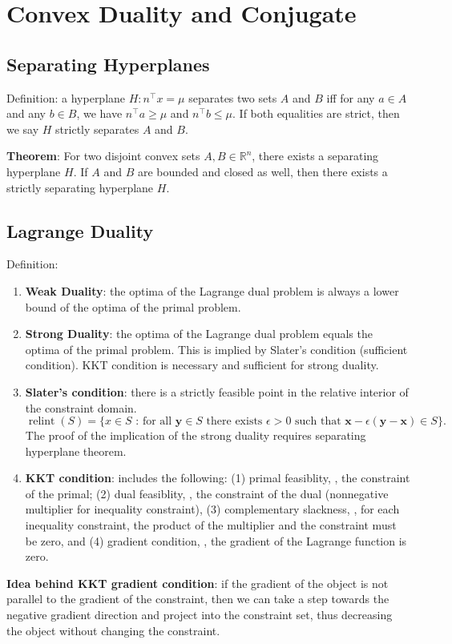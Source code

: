 \section{Convex Duality and Conjugate}

\subsection{Separating Hyperplanes}

Definition: a hyperplane $H: n^\top x = \mu$ separates two sets $A$ and $B$ iff for any $a \in A$ and any $b \in B$, we have $n^\top a \ge \mu$ and $n^\top b \le \mu$. If both equalities are strict, then we say $H$ strictly separates $A$ and $B$.

\textbf{Theorem}: For two disjoint convex sets $A, B \in \mathbb{R}^{n}$, there exists a separating hyperplane $H$. If $A$ and $B$ are bounded and closed as well, then there exists a strictly separating hyperplane $H$.

\subsection{Lagrange Duality}

Definition:
\begin{enumerate}
    \item \textbf{Weak Duality}: the optima of the Lagrange dual problem is always a lower bound of the optima of the primal problem.
    \item \textbf{Strong Duality}: the optima of the Lagrange dual problem equals the optima of the primal problem. This is implied by Slater's condition (sufficient condition). KKT condition is necessary and sufficient for strong duality.
    \item \textbf{Slater's condition}: there is a strictly feasible point in the relative interior of the constraint domain. $\operatorname{relint}(S)=\{x \in S \text { : for all } \boldsymbol{y} \in S \text { there exists } \epsilon>0 \text { such that } \boldsymbol{x}-\epsilon(\boldsymbol{y}-\boldsymbol{x}) \in S\}.$ The proof of the implication of the strong duality requires separating hyperplane theorem.
    \item \textbf{KKT condition}: includes the following: (1) primal feasiblity, \ie, the constraint of the primal; (2) dual feasiblity, \ie, the constraint of the dual (nonnegative multiplier for inequality constraint), (3) complementary slackness, \ie, for each inequality constraint, the product of the multiplier and the constraint must be zero, and (4) gradient condition, \ie, the gradient of the Lagrange function is zero.
\end{enumerate}

\textbf{Idea behind KKT gradient condition}: if the gradient of the object is not parallel to the gradient of the constraint, then we can take a step towards the negative gradient direction and project into the constraint set, thus decreasing the object without changing the constraint.
